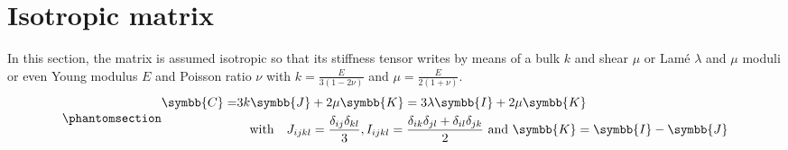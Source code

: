 \documentclass[
  a4paper,
  numbers=noendperiod,
  DIV=12]{scrreprt}
\newcommand{\uuuu}[1]{{\symbb{{#1}}}}
\begin{document}
\section{Isotropic matrix}\label{isotropic-matrix}

In this section, the matrix is assumed isotropic so that its stiffness
tensor writes by means of a bulk \(k\) and shear \(\mu\) or Lamé
\(\lambda\) and \(\mu\) moduli or even Young modulus \(E\) and Poisson
ratio \(\nu\) with \(k=\frac{E}{3(1-2\nu)}\) and
\(\mu=\frac{E}{2(1+\nu)}\).
\begin{equation}\phantomsection\label{eq-isoC}{\begin{aligned}
\uuuu{C} =& {} 3k\uuuu{J}+2\mu\uuuu{K} =  3\lambda\uuuu{I}+2\mu\uuuu{K}\\
 & \quad\textrm{with}\quad J_{ijkl}=\frac{\delta_{ij}\delta_{kl}}{3},
I_{ijkl}=\frac{\delta_{ik}\delta_{jl}+\delta_{il}\delta_{jk}}{2}
\textrm{ and }
\uuuu{K}=\uuuu{I}-\uuuu{J}
\end{aligned}}\end{equation}
\end{document}

